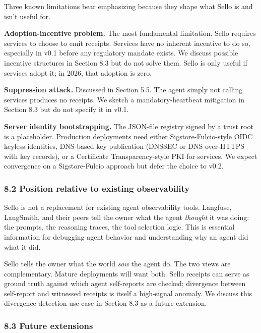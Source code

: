 \documentclass[
  11pt,
]{article}
\begin{document}
Three known limitations bear emphasizing because they shape what Sello
is and isn't useful for.

\textbf{Adoption-incentive problem.} The most fundamental limitation.
Sello requires services to choose to emit receipts. Services have no
inherent incentive to do so, especially in v0.1 before any regulatory
mandate exists. We discuss possible incentive structures in Section 8.3
but do not solve them. Sello is only useful if services adopt it; in
2026, that adoption is zero.

\textbf{Suppression attack.} Discussed in Section 5.5. The agent simply
not calling services produces no receipts. We sketch a
mandatory-heartbeat mitigation in Section 8.3 but do not specify it in
v0.1.

\textbf{Server identity bootstrapping.} The JSON-file registry signed by
a trust root is a placeholder. Production deployments need either
Sigstore-Fulcio-style OIDC keyless identities, DNS-based key publication
(DNSSEC or DNS-over-HTTPS with key records), or a Certificate
Transparency-style PKI for services. We expect convergence on a
Sigstore-Fulcio approach but defer the choice to v0.2.

\hypertarget{position-relative-to-existing-observability}{%
\subsubsection{8.2 Position relative to existing
observability}\label{position-relative-to-existing-observability}}

Sello is not a replacement for existing agent observability tools.
Langfuse, LangSmith, and their peers tell the owner what the agent
\emph{thought} it was doing: the prompts, the reasoning traces, the tool
selection logic. This is essential information for debugging agent
behavior and understanding why an agent did what it did.

Sello tells the owner what the world \emph{saw} the agent do. The two
views are complementary. Mature deployments will want both. Sello
receipts can serve as ground truth against which agent self-reports are
checked; divergence between self-report and witnessed receipts is itself
a high-signal anomaly. We discuss this divergence-detection use case in
Section 8.3 as a future extension.

\hypertarget{future-extensions}{%
\subsubsection{8.3 Future extensions}\label{future-extensions}}
\end{document}
